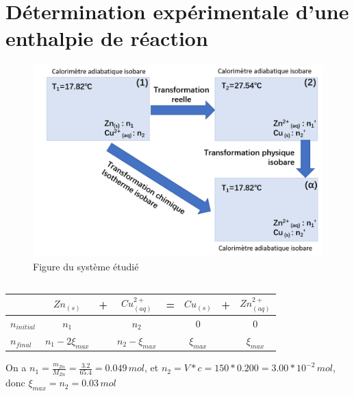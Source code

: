 \documentclass[a4paper,12pt]{book}
\begin{document}
\renewcommand{\labelitemi}{$\blacktriangleright$}
\renewcommand{\labelitemii}{$\bullet$}


\section{Détermination expérimentale d’une enthalpie de réaction}
\begin{figure}[h]
    \begin{center}
    \includegraphics[scale=0.6]{dm5.png}
    \end{center}
    \caption{Figure du système étudié}
\end{figure}
\subsection{}

\begin{table}[h]
\begin{center}
    \begin{tabular}{l|ccccccc}
    \hline
                      & $Zn_{(s)}$      & + & $Cu_{(aq)}^{2+}$       & = & $Cu_{(s)}$ & + & $Zn_{(aq)}^{2+}$ \\ \hline
        $n_{initial}$ & $n_{1}$       &   & $n_{2}$      &   & $0$ & & $0$\\ 
        $n_{final}$      & $n_{1}-2\xi_{max}$  &   & $n_{2}-\xi_{max}$  &   & $\xi_{max}$ & & $\xi_{max}$\\ 
    \end{tabular}
\end{center}
\end{table}
On a $n_1=\frac{m_{Zn}}{M_{Zn}}=\frac{3.2}{65.4}=0.049\,mol$, et $n_2=V*c=150*0.200=3.00*10^{-2}\,mol$, donc $\xi_{max}=n_2=0.03\,mol$
\end{document}

